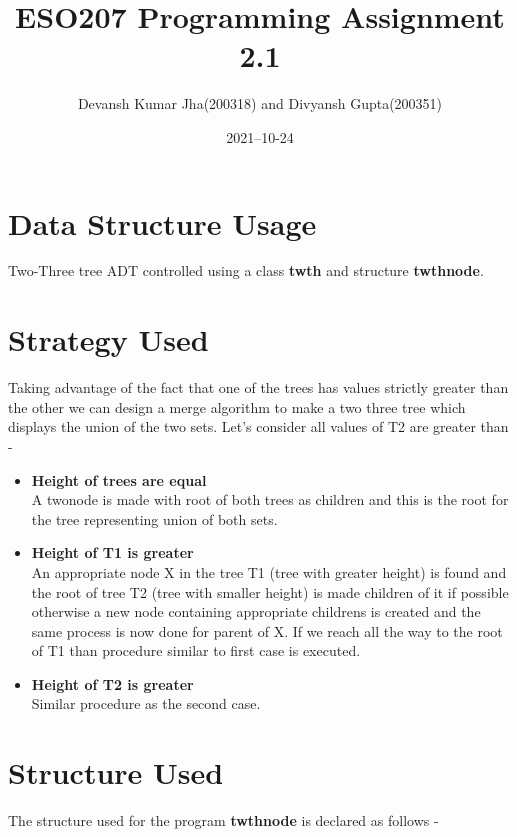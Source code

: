 \documentclass[20pt]{article}
\title{ESO207 Programming Assignment 2.1}
\author{Devansh Kumar Jha(200318) and Divyansh Gupta(200351)}
\date{2021–10-24}
\begin{document}
\maketitle

\section{Data Structure Usage}
Two-Three tree ADT controlled using a class \textbf{twth} and structure \textbf{twthnode}.

\section{Strategy Used}
Taking advantage of the fact that one of the trees has values strictly greater than the other we can design a merge algorithm to make a two three tree which displays the union of the two sets.
Let's consider all values of T2 are greater than -

\begin{itemize}
\item \textbf{Height of trees are equal} \\
A twonode is made with root of both trees as children and this is the root for the tree representing union of both sets.
\item \textbf{Height of T1 is greater} \\
An appropriate node X in the tree T1 (tree with greater height) is found and the root of tree T2 (tree with smaller height) is made children of it if possible otherwise a new node containing appropriate childrens is created and the same process is now done for parent of X. If we reach all the way to the root of T1 than procedure similar to first case is executed.
\item \textbf{Height of T2 is greater} \\
Similar procedure as the second case.
\end{itemize}

\newcommand\mycommfont[1]{\small\ttfamily\textcolor{blue}{#1}}

\section{Structure Used}
The structure used for the program \textbf{twthnode} is declared as follows -
\end{document}

